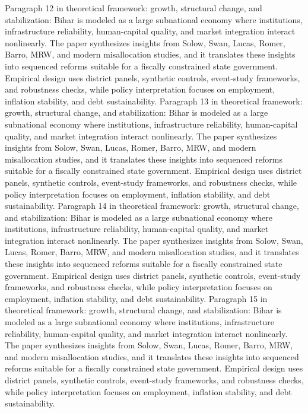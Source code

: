 \documentclass[preprint,12pt]{elsarticle}
\begin{document}
Paragraph 12 in theoretical framework: growth, structural change, and stabilization: Bihar is modeled as a large subnational economy where institutions, infrastructure reliability, human-capital quality, and market integration interact nonlinearly. The paper synthesizes insights from Solow, Swan, Lucas, Romer, Barro, MRW, and modern misallocation studies, and it translates these insights into sequenced reforms suitable for a fiscally constrained state government. Empirical design uses district panels, synthetic controls, event-study frameworks, and robustness checks, while policy interpretation focuses on employment, inflation stability, and debt sustainability.
Paragraph 13 in theoretical framework: growth, structural change, and stabilization: Bihar is modeled as a large subnational economy where institutions, infrastructure reliability, human-capital quality, and market integration interact nonlinearly. The paper synthesizes insights from Solow, Swan, Lucas, Romer, Barro, MRW, and modern misallocation studies, and it translates these insights into sequenced reforms suitable for a fiscally constrained state government. Empirical design uses district panels, synthetic controls, event-study frameworks, and robustness checks, while policy interpretation focuses on employment, inflation stability, and debt sustainability.
Paragraph 14 in theoretical framework: growth, structural change, and stabilization: Bihar is modeled as a large subnational economy where institutions, infrastructure reliability, human-capital quality, and market integration interact nonlinearly. The paper synthesizes insights from Solow, Swan, Lucas, Romer, Barro, MRW, and modern misallocation studies, and it translates these insights into sequenced reforms suitable for a fiscally constrained state government. Empirical design uses district panels, synthetic controls, event-study frameworks, and robustness checks, while policy interpretation focuses on employment, inflation stability, and debt sustainability.
Paragraph 15 in theoretical framework: growth, structural change, and stabilization: Bihar is modeled as a large subnational economy where institutions, infrastructure reliability, human-capital quality, and market integration interact nonlinearly. The paper synthesizes insights from Solow, Swan, Lucas, Romer, Barro, MRW, and modern misallocation studies, and it translates these insights into sequenced reforms suitable for a fiscally constrained state government. Empirical design uses district panels, synthetic controls, event-study frameworks, and robustness checks, while policy interpretation focuses on employment, inflation stability, and debt sustainability.
\end{document}
